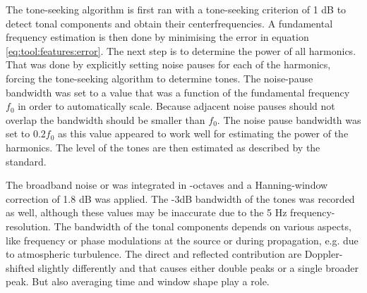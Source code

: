 The tone-seeking algorithm is first ran with a tone-seeking criterion of 1 dB to
detect tonal components and obtain their centerfrequencies. A fundamental
frequency estimation is then done by minimising the error in equation
\eqref{eq:tool:features:error}. The next step is to determine the power of all
harmonics. That was done by explicitly setting noise pauses for each of the
harmonics, forcing the tone-seeking algorithm to determine tones.
The noise-pause bandwidth was set to a value that was a function of the fundamental
frequency $f_0$ in order to automatically scale. Because adjacent noise pauses
should not overlap the bandwidth should be smaller than $f_0$. The noise pause
bandwidth was set to $0.2 f_0$ as this value appeared to work well for
estimating the power of the  harmonics. The level of the tones are
then estimated as described by the standard.

The broadband noise or  was integrated in
-octaves and a Hanning-window correction of 1.8 dB was applied.
The -3dB bandwidth of the tones was recorded as well, although these values may
be inaccurate due to the 5 Hz frequency-resolution. The bandwidth of the tonal
components depends on various aspects, like frequency or phase modulations at
the source or during propagation, e.g. due to atmospheric turbulence. The direct
and reflected contribution are Doppler-shifted slightly differently and that
causes either double peaks or a single broader peak. But also averaging time and
window shape play a role.




